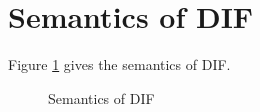 \section{Semantics of DIF}
Figure \ref{figure_semantics} gives the semantics of DIF.

\begin{figure}[h]
    
    \caption{Semantics of DIF}
    \label{figure_semantics}
\end{figure}
